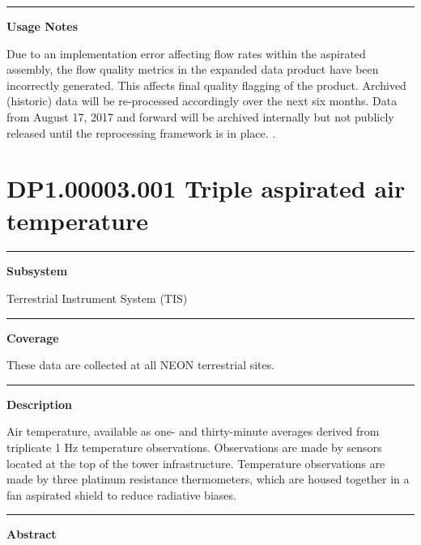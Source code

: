\documentclass[]{article}
\begin{document}
\begin{center}\rule{0.5\linewidth}{\linethickness}\end{center}

\textbf{Usage Notes}

Due to an implementation error affecting flow rates within the aspirated
assembly, the flow quality metrics in the expanded data product have
been incorrectly generated. This affects final quality flagging of the
product. Archived (historic) data will be re-processed accordingly over
the next six months. Data from August 17, 2017 and forward will be
archived internally but not publicly released until the reprocessing
framework is in place. \newpage
.

\section{DP1.00003.001 Triple aspirated air
temperature}\label{dp1.00003.001-triple-aspirated-air-temperature}

\begin{center}\rule{0.5\linewidth}{\linethickness}\end{center}

\textbf{Subsystem}

Terrestrial Instrument System (TIS)

\begin{center}\rule{0.5\linewidth}{\linethickness}\end{center}

\textbf{Coverage}

These data are collected at all NEON terrestrial sites.

\begin{center}\rule{0.5\linewidth}{\linethickness}\end{center}

\textbf{Description}

Air temperature, available as one- and thirty-minute averages derived
from triplicate 1 Hz temperature observations. Observations are made by
sensors located at the top of the tower infrastructure. Temperature
observations are made by three platinum resistance thermometers, which
are housed together in a fan aspirated shield to reduce radiative
biases.

\begin{center}\rule{0.5\linewidth}{\linethickness}\end{center}

\textbf{Abstract}
\end{document}
